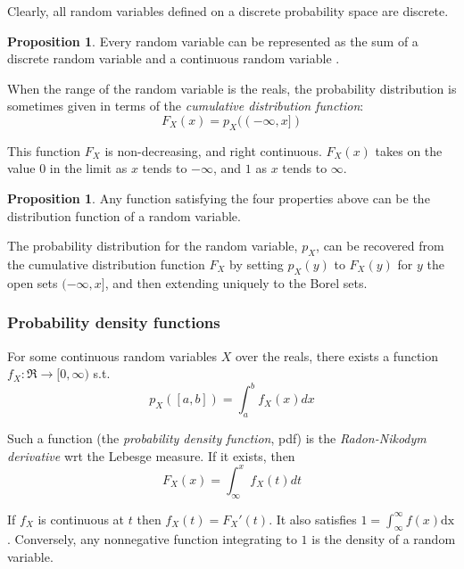 \documentclass{article}
\theoremstyle{definition}
\newtheorem{proposition}[theorem]{Proposition}
\begin{document}
Clearly, all random variables defined on a discrete probability space are discrete.

\begin{proposition}
Every random variable can be represented as the sum of a discrete random variable and a continuous random variable .
\end{proposition}

When the range of the random variable is the reals, the probability distribution is sometimes given in terms of the {\em cumulative distribution function}:
   \[ F_X(x) = p_X((-\infty, x])\]

This function \(F_X\) is non-decreasing, and right continuous. \(F_X(x)\) takes on the value \(0\) in the limit as \(x\) tends to \(-\infty\), and \(1\) as \(x\) tends to \(\infty\).

\begin{proposition}
  Any function satisfying the four properties above can be the distribution function of a random variable.
\end{proposition}

The probability distribution for the random variable, \(p_X\), can be recovered from the cumulative distribution function \(F_X\) by setting \(p_X(y)\) to \(F_X(y)\) for \(y\) the  open sets \((-\infty,x]\), and then extending uniquely to the Borel sets. 

\subsubsection{Probability density functions}


For some continuous random variables \(X\) over the reals, there exists a function \(f_X:\Re \rightarrow [0,\infty)\) s.t.
    \[p_X([a,b]) = \int_a^b f_X(x) \mathit{dx}\]

    Such a function (the {\em probability density function}, pdf) is the {\em Radon-Nikodym derivative} wrt the Lebesge measure. If it exists, then
    \[F_X(x) = \int_{\infty}^x f_X(t) \mathit{dt}\]

    If \(f_X\) is continuous at \(t\) then \(f_X(t)=F_X'(t)\). It also satisfies \(1=\int_{\infty}^{\infty} f(x)\mathrm{dx}\). Conversely, any nonnegative function integrating to \(1\) is the density of a random variable.

\end{document}
